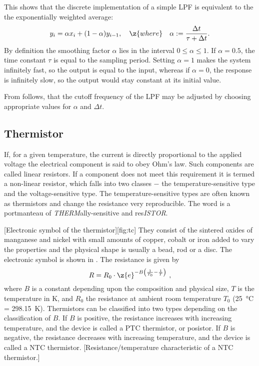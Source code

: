%
This shows that the discrete implementation of a simple \ac{LPF} is equivalent to the the exponentially weighted average:
%
\begin{equation}\label{eq:lpf1}
  y_i = \alpha x_i + (1-\alpha)y_{i-1},\hspace*{1em}\z{ where } \hspace*{1em} \alpha:= \dfrac{\Delta t}{\tau + \Delta t}.
\end{equation}
%
By definition the smoothing factor $\alpha$ lies in the interval $0\le\alpha\le1$. If $\alpha=0.5$, the time constant $\tau$ is equal to the sampling period. Setting $\alpha = 1$ makes the system infinitely fast, so the output is equal to the input, whereas if $\alpha = 0$, the response is infinitely slow, so the output would stay constant at its initial value.\par 
%
From  follows, that the cutoff frequency of the \ac{LPF} may be adjusted by choosing appropriate values for $\alpha$ and $\Delta t$.
%
\subsection{Thermistor}\label{sec:therm}
If, for a given temperature, the current is directly proportional to the applied voltage the electrical component is said to obey Ohm's law. Such components are called linear resistors. If a component does not meet this requirement it is termed a non-linear resistor, which falls into two classes $-$ the temperature-sensitive type and the voltage-sensitive type. The temperature-sensitive types are often known as thermistors and change the resistance very reproducible. The word is a portmanteau of \textit{THERM}ally-sensitive and res\textit{ISTOR}.\par
%
[Electronic symbol of the thermistor][fig:tc]
%
They consist of the sintered oxides of manganese and nickel with small amounts of copper, cobalt or iron added to vary the properties and the physical shape is usually a bead, rod or a disc. The electronic symbol is shown in . The resistance is given by
%
\begin{equation}\label{eq:th}
	R = R_{0}\cdot\z{e}^{-B\left(\frac{1}{T_{0}} - \frac{1}{T}\right)}\ ,
\end{equation}
%
where $B$ is a constant depending upon the composition and physical size, $T$ is the temperature in \si{\kelvin}, and $R_{0}$ the resistance at ambient room temperature $T_{0}$ (\SI{25}{\celsius} = \SI{298.15}{\kelvin}). Thermistors can be classified into two types depending on the classification of $B$. If $B$ is positive, the resistance increases with increasing temperature, and the device is called a \ac{PTC} thermistor, or posistor. If $B$ is negative, the resistance decreases with increasing temperature, and the device is called a \ac{NTC} thermistor.
%
[Resistance/temperature characteristic of a \ac{NTC} thermistor.]
%
